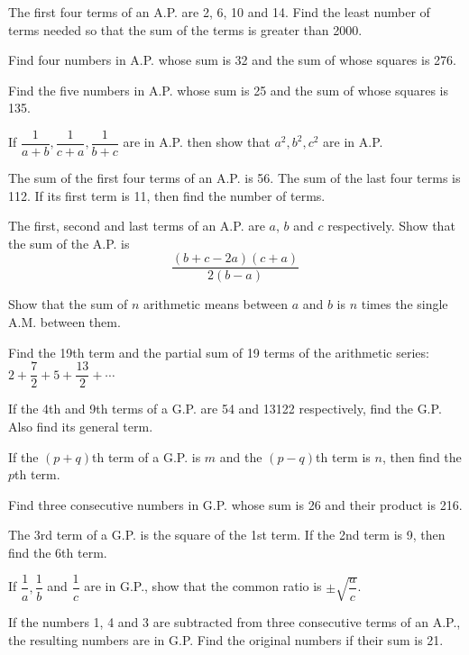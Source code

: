 \documentclass[11pt,a4paper]{article}
\begin{document}
\begin{longlist}
\item The first four terms of an A.P. are 2, 6, 10 and 14. Find the least number of terms needed so that the sum of the terms is greater than 2000.

\item Find four numbers in A.P. whose sum is 32 and the sum of whose squares is 276.

\item Find the five numbers in A.P. whose sum is 25 and the sum of whose squares is 135.

\item If $\dfrac{1}{a+b}, \dfrac{1}{c+a}, \dfrac{1}{b+c}$ are in A.P. then show that $a^2, b^2, c^2$ are in A.P.

\item The sum of the first four terms of an A.P. is 56. The sum of the last four terms is 112. If its first term is 11, then find the number of terms.

\item The first, second and last terms of an A.P. are $a$, $b$ and $c$ respectively. Show that the sum of the A.P. is
\[
\frac{(b+c-2a)(c+a)}{2(b-a)}
\]

\item Show that the sum of $n$ arithmetic means between $a$ and $b$ is $n$ times the single A.M. between them.

\item Find the 19th term and the partial sum of 19 terms of the arithmetic series: $2+\dfrac{7}{2}+5+\dfrac{13}{2}+\cdots$

\item If the 4th and 9th terms of a G.P. are 54 and 13122 respectively, find the G.P. Also find its general term.

\item If the $(p+q)$th term of a G.P. is $m$ and the $(p-q)$th term is $n$, then find the $p$th term.

\item Find three consecutive numbers in G.P. whose sum is 26 and their product is 216.

\item The 3rd term of a G.P. is the square of the 1st term. If the 2nd term is 9, then find the 6th term.

\item If $\dfrac{1}{a}, \dfrac{1}{b}$ and $\dfrac{1}{c}$ are in G.P., show that the common ratio is $\pm\sqrt{\dfrac{a}{c}}$.

\item If the numbers 1, 4 and 3 are subtracted from three consecutive terms of an A.P., the resulting numbers are in G.P. Find the original numbers if their sum is 21.


\end{longlist}
\end{document}
